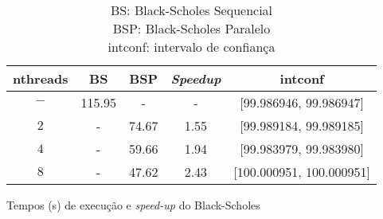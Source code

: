 \begin{table}[h]
\begin{center}
	\begin{tabular}{ |c|c|c|c|c| } 
		\hline
		nthreads & BS & BSP & \textit{Speedup} & intconf \\
		\hline

		$-$ & 115.95 & -     & -    & [99.986946,   99.986947] \\
		$2$ & -      & 74.67 & 1.55 & [99.989184,   99.989185] \\
		$4$ & -      & 59.66 & 1.94 & [99.983979,   99.983980] \\
		$8$ & -      & 47.62 & 2.43 & [100.000951, 100.000951] \\
		
		\hline
	\end{tabular}
	\caption{Tempos (s) de execução e \emph{speed-up} do Black-Scholes \label{tab:bs_res}}
	\caption*{
		BS:  Black-Scholes Sequencial\\
		BSP: Black-Scholes Paralelo\\
		intconf: intervalo de confiança
	}
\end{center}
\end{table}
